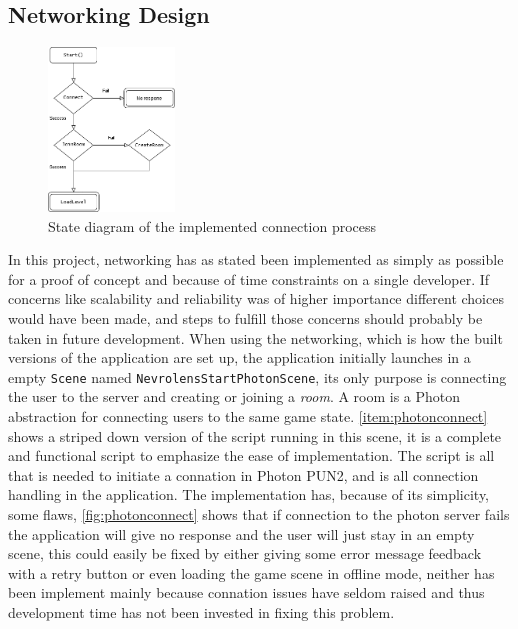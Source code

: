 \subsection*{Networking Design}

\begin{figure} 
    \centering
    \includegraphics[width=0.3\textwidth]{fig/photonconnectiondiagram2.png}
    \caption{State diagram of the implemented connection process}
    \vspace{30pt}
    \label{fig:photonconnect}
\end{figure}
In this project, networking has as stated been implemented as simply as possible for a proof of concept and because of time constraints on a single developer. If concerns like scalability and reliability was of higher importance different choices would have been made, and steps to fulfill those concerns should probably be taken in future development.
When using the networking, which is how the built versions of the application are set up, the application initially launches in a empty \texttt{Scene} named \texttt{NevrolensStartPhotonScene}, its only purpose is connecting the user to the server and creating or joining a \textit{room}. A room is a Photon abstraction for connecting users to the same game state. \autoref{item:photonconnect} shows a striped down version of the script running in this scene, it is a complete and functional script to emphasize the ease of implementation. The script  is all that is needed to initiate a connation in Photon PUN2, and is all connection handling in the application. The implementation has, because of its simplicity, some flaws, \autoref{fig:photonconnect} shows that if connection to the photon server fails the application will give no response and the user will just stay in an empty scene, this could easily be fixed by either giving some error message feedback with a retry button or even loading the game scene in offline mode, neither has been implement mainly because connation issues have seldom raised and thus development time has not been invested in fixing this problem. 

